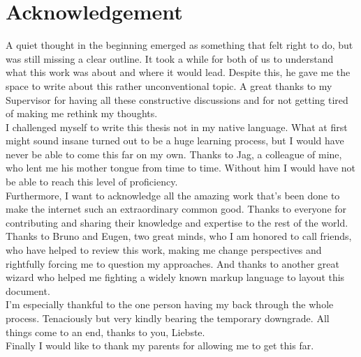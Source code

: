 \documentclass[12pt,english,a4paper,titlepage,cleardoublepage=empty,dottedtoc]{report}
\begin{document}
\section*{Acknowledgement}
A quiet thought in the beginning emerged as something that felt right to
do, but was still missing a clear outline. It took a while for both of
us to understand what this work was about and where it would lead.
Despite this, he gave me the space to write about this rather
unconventional topic. A great thanks to my Supervisor for having all
these constructive discussions and for not getting tired of making me
rethink my thoughts.\\[2\baselineskip]I challenged myself to write this
thesis not in my native language. What at first might sound insane
turned out to be a huge learning process, but I would have never be able
to come this far on my own. Thanks to Jag, a colleague of mine, who lent
me his mother tongue from time to time. Without him I would have not be
able to reach this level of proficiency.\\[2\baselineskip]Furthermore, I
want to acknowledge all the amazing work that's been done to make the
internet such an extraordinary common good. Thanks to everyone for
contributing and sharing their knowledge and expertise to the rest of
the world.\\[2\baselineskip]Thanks to Bruno and Eugen, two great minds,
who I am honored to call friends, who have helped to review this work,
making me change perspectives and rightfully forcing me to question my
approaches. And thanks to another great wizard who helped me fighting a
widely known markup language to layout this document.\\
I'm especially thankful to the one person having my back through the
whole process. Tenaciously but very kindly bearing the temporary
downgrade. All things come to an end, thanks to you, Liebste.\\
Finally I would like to thank my parents for allowing me to get this
far.
\newpage


{
\setcounter{tocdepth}{1}
\pagestyle{plain}
\tableofcontents
}
\newpage
{}
\listoftables
\newpage
{}
\listoffigures
\newpage
\newpage
\end{document}
